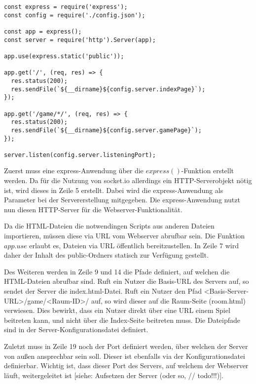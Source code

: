 \vspace{11pt}
\lstset{language=js, style=STYLE_CODE_JS}
\begin{lstlisting}[caption={express Server -- Server.js}, captionpos=b, label={lst:express}]
const express = require('express');
const config = require('./config.json');

const app = express();
const server = require('http').Server(app);

app.use(express.static('public'));

app.get('/', (req, res) => {
  res.status(200);
  res.sendFile(`${__dirname}${config.server.indexPage}`);
});

app.get('/game/*/', (req, res) => {
  res.status(200);
  res.sendFile(`${__dirname}${config.server.gamePage}`);
});

server.listen(config.server.listeningPort);
\end{lstlisting}

Zuerst muss eine express-Anwendung über die $express()$-Funktion erstellt werden. Da für die Nutzung von socket.io allerdings ein \acs{HTTP}-Serverobjekt nötig ist, wird dieses in Zeile 5 erstellt. Dabei wird die express-Anwendung als Parameter bei der Servererstellung mitgegeben. Die express-Anwendung nutzt nun diesen \acs{HTTP}-Server für die Webserver-Funktionalität.\par

Da die \acs{HTML}-Dateien die notwendingen Scripts aus anderen Dateien importieren, müssen diese via \acs{URL} vom Webserver abrufbar sein. Die Funktion $app.use$ erlaubt es, Dateien via \acs{URL} öffentlich bereitzustellen. In Zeile 7 wird daher der Inhalt des \glqq{}public\grqq{}-Ordners statisch zur Verfügung gestellt.\par

Des Weiteren werden in Zeile 9 und 14 die Pfade definiert, auf welchen die \acs{HTML}-Dateien abrufbar sind. Ruft ein Nutzer die Basis-\acs{URL} des Servers auf, so sendet der Server die \glqq{}index.html\grqq{}-Datei. Ruft ein Nutzer den Pfad \grqq{}<Basis-Server-URL>/game/<Raum-ID>/\grqq{} auf, so wird dieser auf die Raum-Seite (\glqq{}room.html\grqq{}) verwiesen. Dies bewirkt, dass ein Nutzer direkt über eine \acs{URL} einem Spiel beitreten kann, und nicht über die Index-Seite beitreten muss. Die Dateipfade sind in der Server-Konfigurationsdatei definiert.

Zuletzt muss in Zeile 19 noch der Port definiert werden, über welchen der Server von außen ansprechbar sein soll. Dieser ist ebenfalls via der Konfigurationsdatei definierbar. Wichtig ist, dass dieser Port des Servers, auf welchem der Webserver läuft, weitergeleitet ist [siehe: Aufsetzen der Server (oder so, // todo!!!)].

